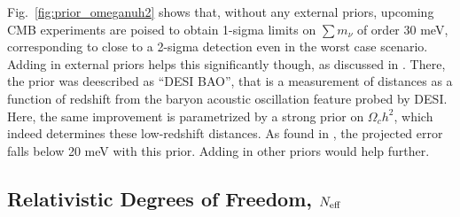 \documentclass[aps,prd,reprint,superscriptaddress]{revtex4-1}
\newcommand{\reffig}[1]{Fig.~\ref{fig:#1}}
\begin{document}
\reffig{prior_omeganuh2} shows that, without any external priors, upcoming CMB experiments are poised to obtain 1-sigma limits on $\sum m_\nu$ of order 30 meV, corresponding to close to a 2-sigma detection even in the worst case scenario. Adding in external priors helps this significantly though, as discussed in \cite{2013arXiv1309.5383A,pan:2015,allison:2015}. There, the prior was deescribed as ``DESI BAO'', that is a measurement of distances as a function of redshift from the baryon acoustic oscillation feature probed by DESI. Here, the same improvement is parametrized by a strong prior on $\Omega_ch^2$, which indeed determines these low-redshift distances. As found in \cite{2013arXiv1309.5383A}, the projected error falls below 20 meV with this prior. Adding in other priors would help further.


\subsection{Relativistic Degrees of Freedom, $N_{\rm eff}$}
\end{document}
